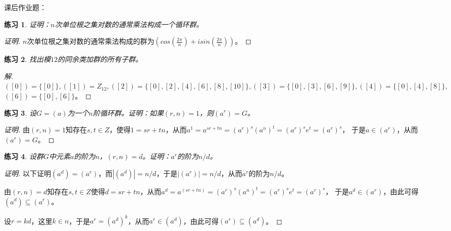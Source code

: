 \documentclass{article}
\newtheorem{Exercise}{练习}
\begin{document}
\begin{CJK*}{UTF8}{gbsn}
课后作业题：
\begin{Exercise}
证明：$n$次单位根之集对数的通常乘法构成一个循环群。
\end{Exercise}
\begin{proof}[证明]
  $n$次单位根之集对数的通常乘法构成的群为$(cos(\frac{2\pi}{n})+isin(\frac{2\pi}{n}))$。
\end{proof}
\begin{Exercise}
找出模$12$的同余类加群的所有子群。
\end{Exercise}
\begin{proof}[解]
  $([0])=\{[0]\},([1])=Z_{12},([2])=\{[0],[2],[4],[6],[8],[10]\},([3])=\{[0],[3],[6],[9]\},([4])=\{[0],[4],[8]\},$
  $([6])=\{[0],[6]\}$。

\end{proof}
\begin{Exercise}
  设$G=(a)$为一个$n$阶循环群。证明：如果$(r,n)=1$，则$(a^r)=G$。
\end{Exercise}

\begin{proof}[证明]
  由$(r,n)=1$知存在$s,t\in Z$，使得$1=sr+tn$，从而$a^1=a^{sr+tn}=(a^r)^s(a^n)^t=(a^r)^se^t=(a^r)^s$，
  于是$a\in (a^r)$，从而$(a^r)=G$。
\end{proof}
\begin{Exercise}
  设群$G$中元素$a$的阶为$n$，$(r,n)=d$。证明：$a^r$的阶为$n/d$。
\end{Exercise}
\begin{proof}[证明]
  以下证明$(a^d)=(a^r)$，而$|(a^d)|=n/d$，于是$|(a^r)|=n/d$，从而$a^r$的阶为$n/d$。

  由$(r,n)=d$知存在$s,t\in Z$使得$d=sr+tn$，从而$a^d=a^{(sr+tn)}=(a^r)^s(a^n)^t=(a^r)^se^t=(a^r)^s$，
  于是$a^d\in (a^r)$，由此可得$(a^d)\subseteq (a^r)$。

  设$r=kd$，这里$k\in n$，于是$a^r=(a^d)^k$，从而$a^r\in (a^d)$，由此可得$(a^r)\subseteq (a^d)$。
\end{proof}
\end{CJK*}
\end{document}
